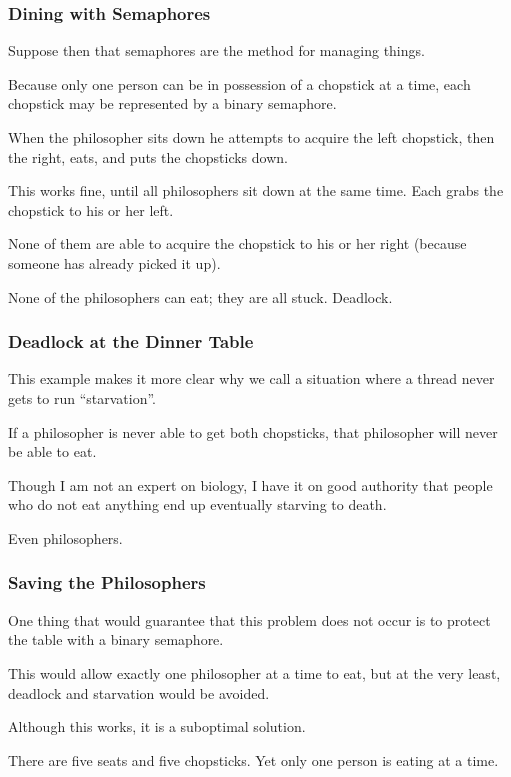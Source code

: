 \begin{frame}
\frametitle{Dining with Semaphores}

 Suppose then that semaphores are the method for managing things. 
 
 Because only one person can be in possession of a chopstick at a time, each chopstick may be represented by a binary semaphore. 
 
When the philosopher sits down he attempts to acquire the left chopstick, then the right, eats, and puts the chopsticks down. 
 
This works fine, until all philosophers sit down at the same time. Each grabs the chopstick to his or her left.

 None of them are able to acquire the chopstick to his or her right (because someone has already picked it up). 
 
 None of the philosophers can eat; they are all stuck. Deadlock.

\end{frame}

\begin{frame}
\frametitle{Deadlock at the Dinner Table}

This example makes it more clear why we call a situation where a thread never gets to run ``starvation''. 

If a philosopher is never able to get both chopsticks, that philosopher will never be able to eat.

Though I am not an expert on biology, I have it on good authority that people who do not eat anything end up eventually starving to death. 

Even philosophers.

\end{frame}

\begin{frame}
\frametitle{Saving the Philosophers}

One thing that would guarantee that this problem does not occur is to protect the table with a binary semaphore. 

This would allow exactly one philosopher at a time to eat, but at the very least, deadlock and starvation would be avoided. 

Although this works, it is a suboptimal solution. 

There are five seats and five chopsticks. Yet only one person is eating at a time. 

\end{frame}



